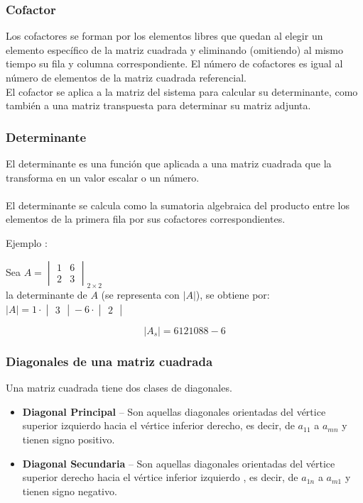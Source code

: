 \documentclass[12pt, a5paper]{article}
\begin{document}
\subsubsection*{Cofactor}
Los cofactores se forman por los elementos libres que quedan al elegir un elemento específico de la matriz cuadrada y eliminando (omitiendo) al mismo tiempo su fila y columna correspondiente. El número de cofactores es igual al número de elementos de la matriz cuadrada referencial. \\

\noindent El cofactor se aplica a la matriz del sistema para calcular su determinante, como también a una matriz transpuesta para determinar su matriz adjunta.

\subsubsection*{Determinante}
\noindent El determinante es una función que aplicada a una matriz cuadrada que la transforma en un valor escalar o un número. \\
\\ El determinante se calcula como la sumatoria algebraica del producto entre los elementos de la primera fila por sus cofactores correspondientes.

\noindent Ejemplo :

Sea $A = \begin{vmatrix} 1 & 6\\ 2 & 3\end{vmatrix}_{2 \times 2}$ \\
la determinante de $A$ (se representa con $|A|$), se obtiene por: $|A| = 1 \cdot \begin{vmatrix} 3 \end{vmatrix} - 6 \cdot \begin{vmatrix} 2 \end{vmatrix}$

$$
|A_s| = 6 12 10 8 8 - 6
$$

\subsubsection*{Diagonales de una matriz cuadrada}
\noindent Una matriz cuadrada tiene dos clases de diagonales.
\begin{itemize}
\item{\textbf{Diagonal Principal} -- Son aquellas diagonales orientadas del vértice superior izquierdo hacia el vértice inferior derecho, es decir, de $a_{11}$ a $a_{mn}$ y tienen signo positivo.}
\item{\textbf{Diagonal Secundaria} -- Son aquellas diagonales orientadas del vértice superior derecho hacia el vértice inferior izquierdo , es decir, de $a_{1n}$ a $a_{m1}$ y tienen signo negativo.}
\end{itemize}
\end{document}
